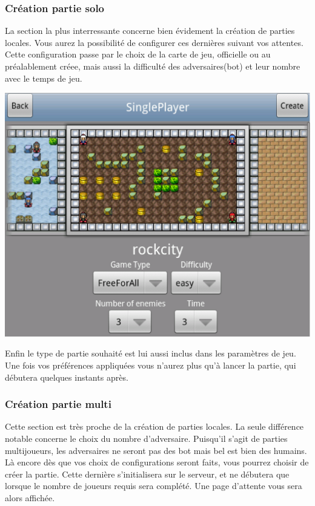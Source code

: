 	\subsubsection{Création partie solo}
	La section la plus interressante concerne bien évidement la création de parties
	locales. Vous aurez la possibilité de configurer ces dernières suivant vos
	attentes. Cette configuration passe par le choix de la carte de jeu, officielle
	ou au préalablement créee, mais aussi la difficulté des adversaires(\gls{bot})
	et leur nombre avec le temps de jeu.
		\begin{center}						
			\includegraphics[scale=0.4]{Developpement/Img/7.eps}
		\end{center} 
	Enfin le type de partie souhaité est lui
	aussi inclus dans les paramètres de jeu. Une fois vos préférences appliquées
	vous n'aurez plus qu'à lancer la partie, qui débutera quelques instants après.
	
	
	\subsubsection{Création partie multi}
	Cette section est très proche de la création de parties locales. La seule
	différence notable concerne le choix du nombre d'adversaire. Puisqu'il s'agit
	de parties multijoueurs, les adversaires ne seront pas des \gls{bot} mais bel
	est bien des humains. 
	Là encore dès que vos choix de configurations seront faits, vous pourrez
	choisir de créer la partie. Cette dernière s'initialisera sur le serveur, et ne
	débutera que lorsque le nombre de joueurs requis sera complété. Une page
	d'attente vous sera alors affichée.
	
